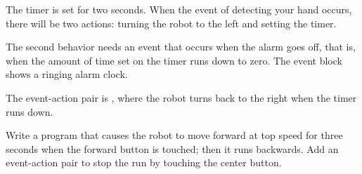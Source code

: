 The timer is set for two seconds. When the event of detecting your
hand occurs, there will be two actions: turning the robot to the left
and setting the timer.

The second behavior needs an event that occurs when the alarm goes off,
that is, when the amount of time set on the timer runs down to zero. The
event block  shows a ringing alarm clock.

The event-action pair is , where the robot turns back to
the right when the timer runs down.


Write a program that causes the robot to move forward at top speed for
three seconds when the forward button is touched; then it runs
backwards. Add an event-action pair to stop the run by touching the
center button.
